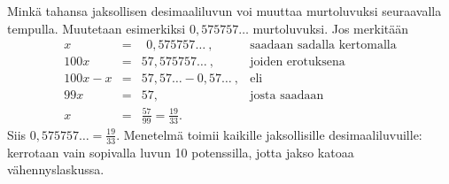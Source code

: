 Minkä tahansa jaksollisen desimaaliluvun voi muuttaa murtoluvuksi seuraavalla tempulla.
Muutetaan esimerkiksi $0,575757\ldots$ murtoluvuksi. Jos merkitään
\[
\begin{array}{rcll}
x &=& \ \, 0,575757 \ldots\ , &\textrm{saadaan sadalla kertomalla} \\
100x &=& 57,575757 \ldots \ , &\textrm{joiden erotuksena} \\
100x - x &=& 57,57 \ldots - 0,57 \ldots \ , & \textrm{eli} \\
99x &=& 57, & \textrm{josta saadaan} \\
x &=& \frac{57}{99} = \frac{19}{33}.
\end{array}
\]
Siis $0,575757\ldots = \frac{19}{33}$. Menetelmä toimii kaikille jaksollisille
desimaaliluvuille: kerrotaan vain sopivalla luvun 10 potenssilla, jotta jakso
katoaa vähennyslaskussa.

